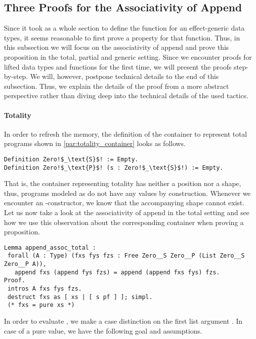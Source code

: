 \subsection{Three Proofs for the Associativity of Append}

Since it took as a whole section to define the function 
for an effect-generic  data types, it seems reasonable to
first prove a property for that function.
Thus, in this subsection we will focus on the associativity of append
and prove this proposition in the total, partial and generic setting.
Since we encounter proofs for lifted data types and functions for the
first time, we will present the proofs step-by-step.
We will, however, postpone technical details to the end of this
subsection.
Thus, we explain the details of the proof from a more abstract
perspective rather than diving deep into the technical details of the
used tactics.

\paragraph{Totality}
In order to refresh the memory, the definition of the
container to represent total programs shown in
\autoref{par:totality_container} looks as follows.

\begin{verbatim}
Definition Zero!$_\text{S}$! := Empty.
Definition Zero!$_\text{P}$! (s : Zero!$_\text{S}$!) := Empty.
\end{verbatim}

That is, the container representing totality has neither a position
nor a shape, thus, programs modeled as  do
not have any  values by construction.
Whenever we encounter an -constructor, we know that the
accompanying shape  cannot exist.
Let us now take a look at the associativity of append in the total
setting and see how we use this observation about the corresponding
container when proving a proposition.

\begin{verbatim}
Lemma append_assoc_total :
 forall (A : Type) (fxs fys fzs : Free Zero__S Zero__P (List Zero__S Zero__P A)),
   append fxs (append fys fzs) = append (append fxs fys) fzs.
Proof.
 intros A fxs fys fzs.
 destruct fxs as [ xs | [ s pf ] ]; simpl.
 (* fxs = pure xs *)
\end{verbatim}

In order to evaluate , we make a case distinction on the
first list argument .
In case of a pure value, we have the following goal and assumptions.

